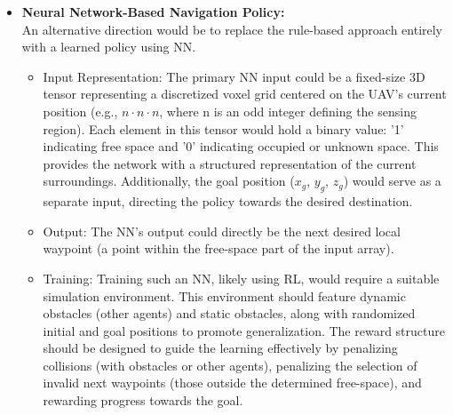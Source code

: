 \begin{itemize}
            \item \textbf{Neural Network-Based Navigation Policy: } \\
                An alternative direction would be to replace the rule-based approach entirely with a learned policy using \ac{NN}.
                \begin{itemize}
                    \item Input Representation: The primary \ac{NN} input could be a fixed-size 3D tensor representing a discretized voxel grid centered on the \ac{UAV}'s current position (e.g., $n \cdot n \cdot n$, where n is an odd integer defining the sensing region). 
                    Each element in this tensor would hold a binary value: '1' indicating free space and '0' indicating occupied or unknown space. 
                    This provides the network with a structured representation of the current surroundings. 
                    Additionally, the goal position ($x_g$, $y_g$, $z_g$) would serve as a separate input, directing the policy towards the desired destination. 
                    \item Output: The \ac{NN}'s output could directly be the next desired local waypoint (a point within the free-space part of the input array).
                    \item Training: Training such an NN, likely using \ac{RL}, would require a suitable simulation environment. 
                    This environment should feature dynamic obstacles (other agents) and static obstacles, along with randomized initial and goal positions to promote generalization. 
                    The reward structure should be designed to guide the learning effectively by penalizing collisions (with obstacles or other agents), penalizing the selection of invalid next waypoints (those outside the determined free-space), and rewarding progress towards the goal.
                \end{itemize}
        \end{itemize}

        


